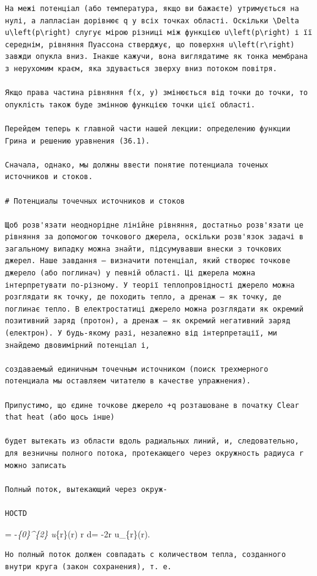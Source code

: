 \documentclass[
  ukrainian,
]{article}
\begin{document}
\begin{verbatim}
На межі потенціал (або температура, якщо ви бажаєте) утримується на нулі, а лапласіан дорівнює q у всіх точках області. Оскільки \Delta u\left(p\right) слугує мірою різниці між функцією u\left(p\right) і її середнім, рівняння Пуассона стверджує, що поверхня u\left(r\right) завжди опукла вниз. Інакше кажучи, вона виглядатиме як тонка мембрана з нерухомим краєм, яка здувається зверху вниз потоком повітря.

Якщо права частина рівняння f(x, y) змінюється від точки до точки, то опуклість також буде змінною функцією точки цієї області.

Перейдем теперь к главной части нашей лекции: определению функции Грина и решению уравнения (36.1).

Сначала, однако, мы должны ввести понятие потенциала точеных источников и стоков.

# Потенциалы точечных источников и стоков

Щоб розв'язати неоднорідне лінійне рівняння, достатньо розв'язати це рівняння за допомогою точкового джерела, оскільки розв'язок задачі в загальному випадку можна знайти, підсумувавши внески з точкових джерел. Наше завдання — визначити потенціал, який створює точкове джерело (або поглинач) у певній області. Ці джерела можна інтерпретувати по-різному. У теорії теплопровідності джерело можна розглядати як точку, де походить тепло, а дренаж — як точку, де поглинає тепло. В електростатиці джерело можна розглядати як окремий позитивний заряд (протон), а дренаж — як окремий негативний заряд (електрон). У будь-якому разі, незалежно від інтерпретації, ми знайдемо двовимірний потенціал і,

создаваемый единичным точечным источником (поиск трехмерного потенциала мы оставляем читателю в качестве упражнения).

Припустимо, що єдине точкове джерело +q розташоване в початку Clear that heat (або щось інше)

будет вытекать из области вдоль радиальных линий, и, следовательно, для везничны полного потока, протекающего через окружность радиуса r можно записать

Полный поток, вытекающий через окруж-

HOCTD
\end{verbatim}

= -\int\emph{\{0\}\^{}\{2\pi\} u}\{r\}(r) r d\theta = -2\pi r
u\_\{r\}(r).

\begin{verbatim}
Но полный поток должен совпадать с количеством тепла, созданного внутри круга (закон сохранения), т. е.
\end{verbatim}
\end{document}
